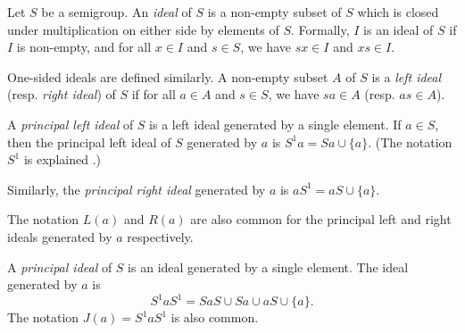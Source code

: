 \documentclass[12pt]{article}
\begin{document}

Let $S$ be a semigroup.  An \emph{ideal} of $S$ is a non-empty subset of $S$ which is closed under multiplication on either side by elements of $S$.  Formally, $I$ is an ideal of $S$ if $I$ is non-empty, and for all $x \in I$ and $s \in S$, we have $sx \in I$ and $xs \in I$.

One-sided ideals are defined similarly.  A non-empty subset $A$ of $S$ is a \emph{left ideal} (resp. \emph{right ideal}) of $S$ if for all $a \in A$ and $s \in S$, we have $sa \in A$ (resp. $as \in A$).

A \emph{principal left ideal} of $S$ is a left ideal generated by a single element.  If $a \in S$, then the principal left ideal of $S$ generated by $a$ is $S^1a = Sa \cup \{a\}$.  (The notation $S^1$ is explained .)

Similarly, the \emph{principal right ideal} generated by $a$ is $aS^1 = aS \cup \{a\}$.

The notation $L(a)$ and $R(a)$ are also common for the principal left and right ideals generated by $a$ respectively.

A \emph{principal ideal} of $S$ is an ideal generated by a single element.  The ideal generated by $a$ is $$S^1aS^1 = SaS \cup Sa \cup aS \cup \{a\}.$$  The notation $J(a) = S^1aS^1$ is also common.
\end{document}
